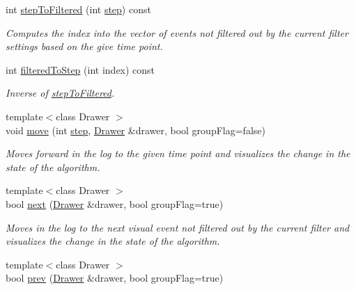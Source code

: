 \begin{DoxyCompactItemize}
int \hyperlink{structslb_1_1core_1_1ui_1_1VisualLog_a7cc1fc6e64c5db9f3bfe78edb857ebd4}{step\+To\+Filtered} (int \hyperlink{structslb_1_1core_1_1ui_1_1VisualLog_a94ff08077c466eadb304d2564a22869c}{step}) const 
\begin{DoxyCompactList}\small\item\em Computes the index into the vector of events not filtered out by the current filter settings based on the give time point. \end{DoxyCompactList}\item 
int \hyperlink{structslb_1_1core_1_1ui_1_1VisualLog_a3e35a401b5c69aea1511783dc5ef2fbe}{filtered\+To\+Step} (int index) const 
\begin{DoxyCompactList}\small\item\em Inverse of \hyperlink{structslb_1_1core_1_1ui_1_1VisualLog_a7cc1fc6e64c5db9f3bfe78edb857ebd4}{step\+To\+Filtered}. \end{DoxyCompactList}\item 
{\footnotesize template$<$class Drawer $>$ }\\void \hyperlink{structslb_1_1core_1_1ui_1_1VisualLog_a15b69a677b8adfaf9ddbf98fc4cafc85}{move} (int \hyperlink{structslb_1_1core_1_1ui_1_1VisualLog_a94ff08077c466eadb304d2564a22869c}{step}, \hyperlink{structslb_1_1core_1_1ui_1_1Drawer}{Drawer} \&drawer, bool group\+Flag=false)
\begin{DoxyCompactList}\small\item\em Moves forward in the log to the given time point and visualizes the change in the state of the algorithm. \end{DoxyCompactList}\item 
{\footnotesize template$<$class Drawer $>$ }\\bool \hyperlink{structslb_1_1core_1_1ui_1_1VisualLog_ace600c20edb1a2fad66467118c011c0d}{next} (\hyperlink{structslb_1_1core_1_1ui_1_1Drawer}{Drawer} \&drawer, bool group\+Flag=true)
\begin{DoxyCompactList}\small\item\em Moves in the log to the next visual event not filtered out by the current filter and visualizes the change in the state of the algorithm. \end{DoxyCompactList}\item 
{\footnotesize template$<$class Drawer $>$ }\\bool \hyperlink{structslb_1_1core_1_1ui_1_1VisualLog_a272e8d2c8bb5ff7486d4b71e84d61512}{prev} (\hyperlink{structslb_1_1core_1_1ui_1_1Drawer}{Drawer} \&drawer, bool group\+Flag=true)

\end{DoxyCompactItemize}
